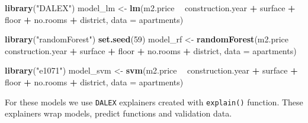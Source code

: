 \documentclass[12pt,]{krantz}
\newenvironment{Shaded}{\begin{snugshade}}{\end{snugshade}}
\newcommand{\DataTypeTok}[1]{\textcolor[rgb]{0.13,0.29,0.53}{#1}}
\newcommand{\DecValTok}[1]{\textcolor[rgb]{0.00,0.00,0.81}{#1}}
\newcommand{\KeywordTok}[1]{\textcolor[rgb]{0.13,0.29,0.53}{\textbf{#1}}}
\newcommand{\NormalTok}[1]{#1}
\newcommand{\OperatorTok}[1]{\textcolor[rgb]{0.81,0.36,0.00}{\textbf{#1}}}
\newcommand{\OtherTok}[1]{\textcolor[rgb]{0.56,0.35,0.01}{#1}}
\newcommand{\StringTok}[1]{\textcolor[rgb]{0.31,0.60,0.02}{#1}}
\begin{document}
\begin{Shaded}
\begin{Highlighting}[]
\KeywordTok{library}\NormalTok{(}\StringTok{"DALEX"}\NormalTok{)}
\NormalTok{model_lm <-}\StringTok{ }\KeywordTok{lm}\NormalTok{(m2.price }\OperatorTok{~}\StringTok{ }\NormalTok{construction.year }\OperatorTok{+}\StringTok{ }\NormalTok{surface }\OperatorTok{+}\StringTok{ }\NormalTok{floor }\OperatorTok{+}\StringTok{ }
\StringTok{                      }\NormalTok{no.rooms }\OperatorTok{+}\StringTok{ }\NormalTok{district, }\DataTypeTok{data =}\NormalTok{ apartments)}

\KeywordTok{library}\NormalTok{(}\StringTok{"randomForest"}\NormalTok{)}
\KeywordTok{set.seed}\NormalTok{(}\DecValTok{59}\NormalTok{)}
\NormalTok{model_rf <-}\StringTok{ }\KeywordTok{randomForest}\NormalTok{(m2.price }\OperatorTok{~}\StringTok{ }\NormalTok{construction.year }\OperatorTok{+}\StringTok{ }\NormalTok{surface }\OperatorTok{+}\StringTok{ }\NormalTok{floor }\OperatorTok{+}\StringTok{ }
\StringTok{                      }\NormalTok{no.rooms }\OperatorTok{+}\StringTok{ }\NormalTok{district, }\DataTypeTok{data =}\NormalTok{ apartments)}

\KeywordTok{library}\NormalTok{(}\StringTok{"e1071"}\NormalTok{)}
\NormalTok{model_svm <-}\StringTok{ }\KeywordTok{svm}\NormalTok{(m2.price }\OperatorTok{~}\StringTok{ }\NormalTok{construction.year }\OperatorTok{+}\StringTok{ }\NormalTok{surface }\OperatorTok{+}\StringTok{ }\NormalTok{floor }\OperatorTok{+}\StringTok{ }
\StringTok{                         }\NormalTok{no.rooms }\OperatorTok{+}\StringTok{ }\NormalTok{district, }\DataTypeTok{data =}\NormalTok{ apartments)}
\end{Highlighting}
\end{Shaded}

For these models we use \texttt{DALEX} explainers created with \texttt{explain()} function. These explainers wrap models, predict functions and validation data.

\begin{Shaded}
\end{Shaded}
\end{document}
